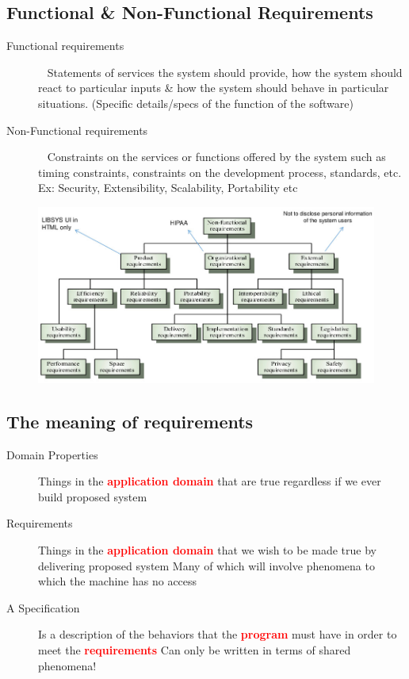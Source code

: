 \documentclass{report}
\newcommand{\textr}[1]{\textcolor{red}{#1}}
\newcommand{\textbfr}[1]{\textbf{\textr{#1}}}
\begin{document}
\subsection{Functional \& Non-Functional Requirements}
\begin{description}
  \item [Functional requirements] \ \newline
   Statements of services the system should provide, how the system should react to particular inputs \& how the system should behave in particular situations. (Specific details/specs of the function of the software)
  \item [Non-Functional requirements] \ \newline
   Constraints on the services or functions offered by the system such as timing constraints, constraints on the development process, standards, etc. Ex: Security, Extensibility, Scalability, Portability etc
\end{description}
\begin{figure}[H]
\centering
\includegraphics[scale=.45,trim=1cm 1cm 1cm 1cm]{assets/CEN4010_Non-Function_Requirements.jpg}
\end{figure}


\subsection{The meaning of requirements}
\begin{description}
  \item [Domain Properties] Things in the \textbfr{application domain} that are true regardless if we ever build  proposed system
  \item [Requirements] Things in the \textbfr{application domain} that we wish to be made true by delivering proposed system\newline
Many of which will involve phenomena to which the machine has no
access
  \item [A Specification] Is a description of the behaviors that the \textbfr{program} must have in order to meet the \textbfr{requirements}\newline 
Can only be written in terms of shared phenomena!
\end{description}
\end{document}
